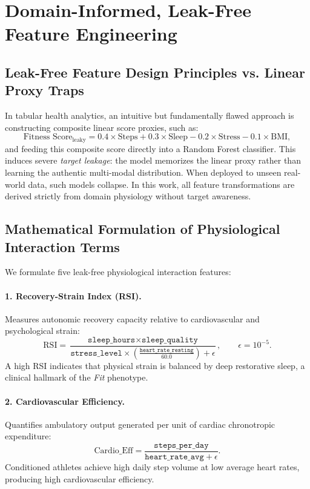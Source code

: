 \documentclass[11pt,a4paper]{article}
\begin{document}
\section{Domain-Informed, Leak-Free Feature Engineering}

\subsection{Leak-Free Feature Design Principles vs. Linear Proxy Traps}
In tabular health analytics, an intuitive but fundamentally flawed approach is constructing composite linear score proxies, such as:
\begin{equation}
\text{Fitness Score}_{\text{leaky}} = 0.4 \times \text{Steps} + 0.3 \times \text{Sleep} - 0.2 \times \text{Stress} - 0.1 \times \text{BMI},
\end{equation}
and feeding this composite score directly into a Random Forest classifier. This induces severe \emph{target leakage}: the model memorizes the linear proxy rather than learning the authentic multi-modal distribution. When deployed to unseen real-world data, such models collapse. In this work, all feature transformations are derived strictly from domain physiology without target awareness.

\subsection{Mathematical Formulation of Physiological Interaction Terms}
We formulate five leak-free physiological interaction features:

\paragraph{1. Recovery-Strain Index (RSI).} Measures autonomic recovery capacity relative to cardiovascular and psychological strain:
\begin{equation}
\mathrm{RSI} = \frac{\texttt{sleep\_hours} \times \texttt{sleep\_quality}}{\texttt{stress\_level} \times \left( \frac{\texttt{heart\_rate\_resting}}{60.0} \right) + \epsilon}, \qquad \epsilon = 10^{-5}.
\end{equation}
A high RSI indicates that physical strain is balanced by deep restorative sleep, a clinical hallmark of the \emph{Fit} phenotype.

\paragraph{2. Cardiovascular Efficiency.} Quantifies ambulatory output generated per unit of cardiac chronotropic expenditure:
\begin{equation}
\mathrm{Cardio\_Eff} = \frac{\texttt{steps\_per\_day}}{\texttt{heart\_rate\_avg} + \epsilon}.
\end{equation}
Conditioned athletes achieve high daily step volume at low average heart rates, producing high cardiovascular efficiency.
\end{document}
